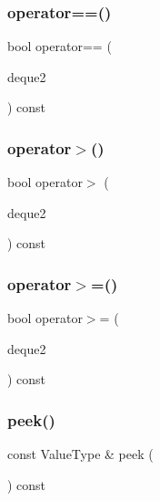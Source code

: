 \subsubsection{\texorpdfstring{operator==()}{operator==()}}
{\footnotesize\ttfamily bool operator== (\begin{DoxyParamCaption}\item[{const \mbox{\hyperlink{classDeque}{Deque}}$<$ Value\+Type $>$ \&}]{deque2 }\end{DoxyParamCaption}) const}

\mbox{\label{classDeque_ad16a7887ef76856de7f882fb53cc8992}} 
\subsubsection{\texorpdfstring{operator$>$()}{operator>()}}
{\footnotesize\ttfamily bool operator$>$ (\begin{DoxyParamCaption}\item[{const \mbox{\hyperlink{classDeque}{Deque}}$<$ Value\+Type $>$ \&}]{deque2 }\end{DoxyParamCaption}) const}

\mbox{\label{classDeque_a033d291120793fffa944ffcc72cc947a}} 
\subsubsection{\texorpdfstring{operator$>$=()}{operator>=()}}
{\footnotesize\ttfamily bool operator$>$= (\begin{DoxyParamCaption}\item[{const \mbox{\hyperlink{classDeque}{Deque}}$<$ Value\+Type $>$ \&}]{deque2 }\end{DoxyParamCaption}) const}

\mbox{\label{classDeque_a74501ededf728c31068dd28a70a8a1f2}} 
\subsubsection{\texorpdfstring{peek()}{peek()}}
{\footnotesize\ttfamily const Value\+Type \& peek (\begin{DoxyParamCaption}{ }\end{DoxyParamCaption}) const}

